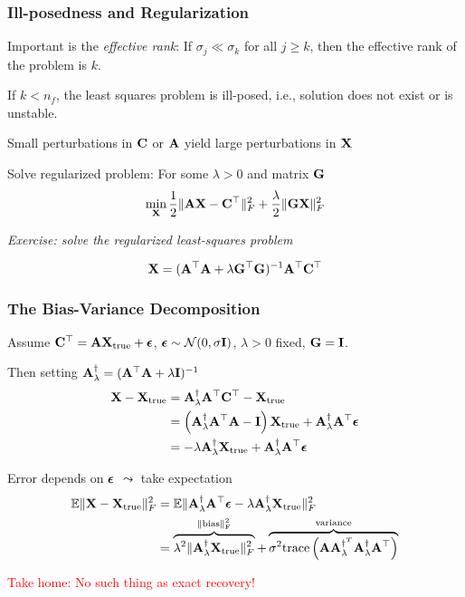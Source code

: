\documentclass[12pt,fleqn,handout]{beamer}
\begin{document}
\begin{frame}\frametitle{Ill-posedness and Regularization}

Important is the \emph{effective rank}: If $\sigma_j \ll \sigma_k$ for all
$j\geq k$, then the effective rank of the problem is $k$.

\bigskip

If $k < n_f$, the least squares problem is ill-posed, i.e., solution does not exist or is unstable.

Small perturbations
in ${\bf C}$ or ${\bf A}$ yield large perturbations in ${\bf X}$

\bigskip

Solve regularized problem: For some $\lambda>0$ and matrix ${\bf G}$
$$ \min_{\bf X} {\frac 12} \|{\bf A}{\bf X} - {\bf C}^\top\|_F^2 + {\frac {\lambda}2} \|{\bf G} {\bf X}\|_F^2 $$

{
{\em Exercise: solve the regularized least-squares problem}
}
\pause


$$ {\bf X} = ({\bf A}^{\top} {\bf A} + \lambda {\bf G}^\top{\bf G})^{-1} {\bf A}^{\top} {\bf C}^\top $$
\end{frame}

\begin{frame}\frametitle{The Bias-Variance Decomposition}

Assume ${\bf C}^\top = {\bf A} {\bf X}_{\rm true}  + {\boldsymbol \epsilon}$, ${\boldsymbol \epsilon} \sim\mathcal{N}(0,\sigma {\bf I})$,  $\lambda>0$ fixed, ${\bf G}={\bf I}$.

Then setting  ${\bf A}^{\dag}_{\lambda} = ({\bf A}^{\top} {\bf A} + \lambda {\bf I})^{-1}$
\begin{align*}
	{\bf X} - {\bf X}_{\rm true} & = {\bf A}^{\dag}_{\lambda} {\bf A}^{\top} {\bf C}^\top - {\bf X}_{\rm true} \\
	                      & = \left({\bf A}^{\dag}_{\lambda} {\bf A}^{\top} {\bf A} - {\bf I} \right)  {\bf X}_{\rm true} +
	{\bf A}^{\dag}_{\lambda} {\bf A}^{\top} {\boldsymbol \epsilon} \\
	                     & = -\lambda {\bf A}^{\dag}_{\lambda}{\bf X}_{\rm true}+
	{\bf A}^{\dag}_{\lambda} {\bf A}^{\top} {\boldsymbol \epsilon}
\end{align*}

\pause

Error depends on ${\boldsymbol \epsilon}$ $\leadsto$ take expectation
\begin{align*}
 {\mathbb E} \|{\bf X} - {\bf X}_{\rm true}\|_F^2 &= {\mathbb E}
\|{\bf A}^{\dag}_{\lambda} {\bf A}^{\top} {\boldsymbol \epsilon} -\lambda {\bf A}^{\dag}_{\lambda}{\bf X}_{\rm true} \|_F^2   \\
&=\overbrace{ \lambda^2 \|{\bf A}^{\dag}_{\lambda}{\bf X}_{\rm true}\|_F^2}^{\rm \|bias\|_F^2} +
\overbrace{\sigma^2 {\rm trace}\left( {\bf A} {\bf A}^{\dag^T}_{\lambda} {\bf A}^{\dag}_{\lambda} {\bf A}^{\top} \right)}^{\rm variance}
\end{align*}

\pause
\begin{center}
	\textcolor{red}{Take home: No such thing as exact recovery!}	
\end{center}


\end{frame}
\end{document}
